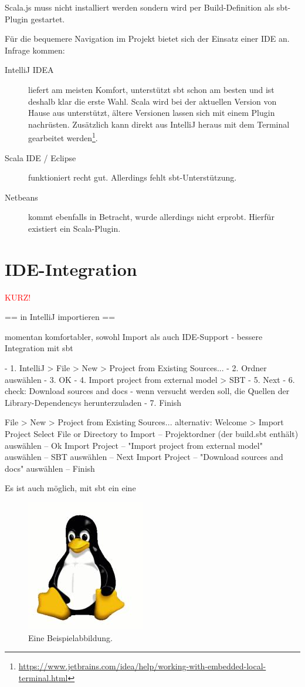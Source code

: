 \documentclass[a4paper, 12pt, hidelinks, listof=totoc, listoftables=totoc, bibliography=totoc]{scrreprt}
\newcommand{\TODO}[1]{\textcolor{red}{#1}\newline}
\begin{document}
Scala.js muss nicht installiert werden sondern wird per Build-Definition als sbt-Plugin gestartet.

Für die bequemere Navigation im Projekt bietet sich der Einsatz einer \ac{IDE} an. Infrage kommen:

\begin{description}
	\item[IntelliJ IDEA] liefert am meisten Komfort, unterstützt sbt schon am besten und ist deshalb klar die erste Wahl. Scala wird bei der aktuellen Version von Hause aus unterstützt, ältere Versionen lassen sich mit einem Plugin nachrüsten. Zusätzlich kann direkt aus IntelliJ heraus mit dem Terminal gearbeitet werden\footnote{\url{https://www.jetbrains.com/idea/help/working-with-embedded-local-terminal.html}}.
	\item[Scala IDE / Eclipse] funktioniert recht gut. Allerdings fehlt sbt-Unterstützung.
	\item[Netbeans] kommt ebenfalls in Betracht, wurde allerdings nicht erprobt. Hierfür existiert ein Scala-Plugin.
\end{description}


\section{IDE-Integration}

\TODO{KURZ!}

== in IntelliJ importieren ==

momentan komfortabler, sowohl Import als auch \ac{IDE}-Support
	- bessere Integration mit sbt

- 1. IntelliJ > File > New > Project from Existing Sources...
- 2. Ordner auswählen
- 3. OK
- 4. Import project from external model > SBT
- 5. Next
- 6. check: Download sources and docs - wenn versucht werden soll, die Quellen der Library-Dependencys herunterzuladen
- 7. Finish

File > New > Project from Existing Sources...
alternativ: Welcome > Import Project
Select File or Directory to Import -- Projektordner (der build.sbt enthält) auswählen -- Ok
Import Project -- "Import project from external model" auswählen -- SBT auswählen -- Next
Import Project -- "Download sources and docs" auswählen -- Finish

Es ist auch möglich, mit sbt ein eine 


\begin{figure}[!h]
    \centering
    \includegraphics[width=0.25\linewidth]{tux}
    \caption{Eine Beispielabbildung. \cite{aab.FBB}}
    \label{fig:a_picture_of_tux}
\end{figure}
\end{document}
